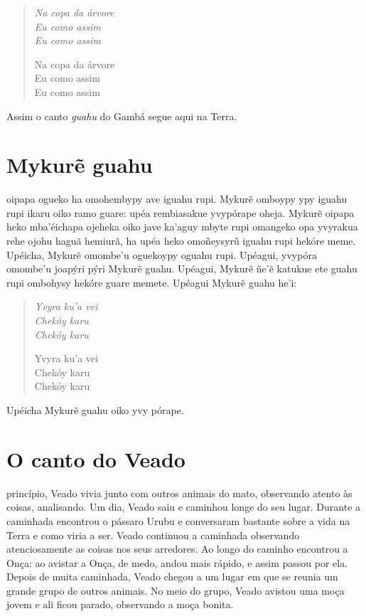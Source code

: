 \begin{verse}
\itshape
Na copa da árvore\\
Eu como assim\\
Eu como assim

Na copa da árvore\\
Eu como assim\\
Eu como assim
\end{verse}

Assim o canto \emph{guahu} do Gambá segue aqui na Terra.

\chapter{Mykurẽ guahu}

 oipapa ogueko ha omohembypy ave iguahu rupi. Mykurẽ omboypy ypy
iguahu rupi ikaru oiko ramo guare: upéa rembiasakue yvypórape oheja.
Mykurẽ oipapa heko mba'éichapa ojeheka oiko jave ka'aguy mbyte rupi
omangeko opa yvyrakua rehe ojohu haguã hemiurã, ha upéa heko omoñeysyrũ
iguahu rupi hekóre meme. Upéicha, Mykurẽ omombe'u oguekoypy oguahu rupi.
Upéagui, yvypóra omombe'u joapýri pýri Mykurẽ guahu. Upéagui, Mykurẽ
ñe'ẽ katukue ete guahu rupi ombohysy hekóre guare memete. Upéagui Mykurẽ
guahu he'i:

\begin{verse}
\itshape
Yvyra ku'a vei\\
Chekóy karu\\
Chekóy karu

Yvyra ku'a vei\\
Chekóy karu\\
Chekóy karu
\end{verse}

Upéicha Mykurẽ guahu oiko yvy pórape.

\chapter{O canto do Veado}

 princípio, Veado vivia junto com outros animais do mato, observando
atento às coisas, analisando. Um dia, Veado saiu e caminhou longe do seu
lugar. Durante a caminhada encontrou o pássaro Urubu e conversaram
bastante sobre a vida na Terra e como viria a ser. Veado continuou a
caminhada observando atenciosamente as coisas nos seus arredores. Ao
longo do caminho encontrou a Onça: ao avistar a Onça, de medo, andou mais
rápido, e assim passou por ela. Depois de muita caminhada, Veado chegou
a um lugar em que se reunia um grande grupo de outros animais. No meio
do grupo, Veado avistou uma moça jovem e ali ficou parado, observando a
moça bonita.

